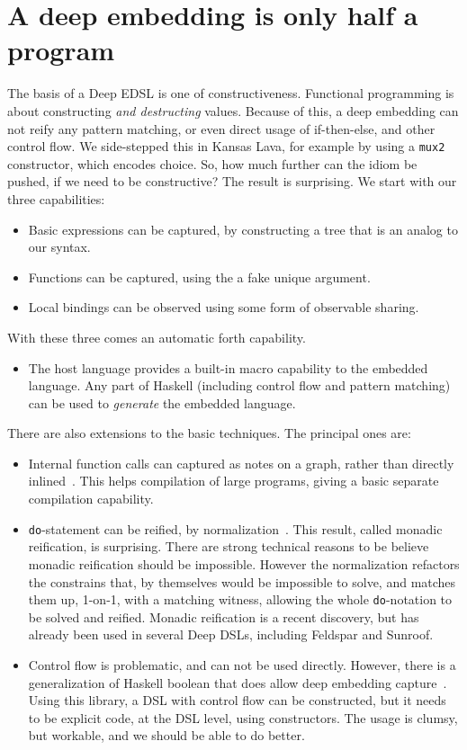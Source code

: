 \documentclass[11pt]{article}
\begin{document}
\section{A deep embedding is only half a program}

The basis of a Deep EDSL is one of constructiveness.
Functional programming is about constructing {\em and destructing\/} values.
Because of this, a deep embedding can not reify any pattern matching, 
or even direct usage of if-then-else, and other control flow. We side-stepped this
in Kansas Lava, for example by using a \verb|mux2| constructor, 
which encodes choice.
So, how much further can the idiom be pushed, if we need to be constructive?
The result is surprising. We start with our three capabilities:
\begin{itemize}
\item Basic expressions can be captured, by constructing a tree that is an analog to our syntax.
\item Functions can be captured, using the a fake unique argument.
\item Local bindings can be observed using some form of observable sharing.
\end{itemize}
With these three comes an automatic forth capability.
\begin{itemize}
\item The host language provides a built-in macro capability to the embedded language.
Any part of Haskell (including control flow and pattern matching) can be used
to {\em generate\/} the embedded language. 
\end{itemize}

\noindent
There are also extensions to the basic techniques. The principal ones are:
\begin{itemize}
\item Internal function calls can captured as notes on a graph, 
rather than directly inlined~\cite{Mainland:10:Nikola}. 
This helps compilation of large programs, giving a basic separate compilation capability.
\item \verb|do|-statement can be reified, by normalization~\cite{Sculthorpe:13:ConstrainedMonad,Svenningsson:13:CompositionalMonadReification,Persson:11:GenericMonadicConstructs}. This result, called monadic
reification, is surprising. There are strong technical reasons to be believe monadic reification
should be impossible. However the normalization refactors the constrains that, by themselves would
be impossible to solve, and matches them up, 1-on-1, with a matching witness, allowing the whole
\verb|do|-notation to be solved and reified.
Monadic reification is a recent discovery, but has already been used in several Deep DSLs,
including Feldspar\cite{Axelsson:2010:DandI-Feldspar} and Sunroof\cite{Bracker:14:Sunroof}.
\item Control flow is problematic, and can not be used directly. However,
there is a generalization of Haskell boolean that does allow deep embedding capture~\cite{hackage:boolean}.
Using this library, a DSL with control flow can be constructed, but it needs to be explicit
code, at the DSL level, using constructors. The usage is clumsy, but workable, and we should
be able to do better.
\end{itemize}
\end{document}
